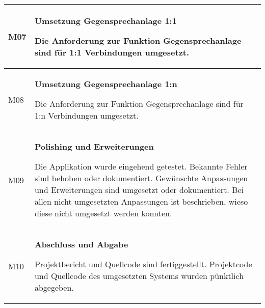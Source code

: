 \begin{table}[h]
\begin{tabular}{|l|p{15cm}|}
        M07         & \textbf{Umsetzung Gegensprechanlage 1:1}

        Die Anforderung zur Funktion Gegensprechanlage sind für 1:1 Verbindungen umgesetzt. \\
        \hline

        M08         & \textbf{Umsetzung Gegensprechanlage 1:n}

        Die Anforderung zur Funktion Gegensprechanlage sind für 1:n Verbindungen umgesetzt. \\
        \hline

        M09         & \textbf{Polishing und Erweiterungen}

        Die Applikation wurde eingehend getestet.
        Bekannte Fehler sind behoben oder dokumentiert.
        Gewünschte Anpassungen und Erweiterungen sind umgesetzt oder dokumentiert.
        Bei allen nicht umgesetzten Anpassungen ist beschrieben, wieso diese nicht umgesetzt werden konnten.
        \\
        \hline

        M10         & \textbf{Abschluss und Abgabe}

        Projektbericht und Quellcode sind fertiggestellt.
        Projektcode und Quellcode des umgesetzten Systems wurden pünktlich abgegeben.\\
        \hline
    \end{tabular}\label{tab:milestones}
\end{table}

\clearpage
